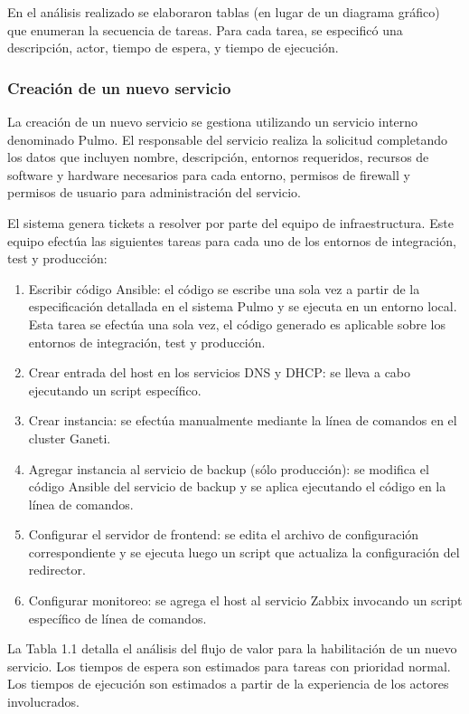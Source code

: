 En el análisis realizado se elaboraron tablas (en lugar de un diagrama gráfico) que enumeran la secuencia de tareas. Para cada tarea, se especificó una descripción, actor, tiempo de espera, y tiempo de ejecución. 

\subsubsection{Creación de un nuevo servicio}

La creación de un nuevo servicio se gestiona utilizando un servicio interno denominado Pulmo. El responsable del servicio realiza la solicitud completando los datos que incluyen nombre, descripción, entornos requeridos, recursos de software y hardware necesarios para cada entorno, permisos de firewall y permisos de usuario para administración del servicio.

El sistema genera tickets a resolver por parte del equipo de infraestructura. Este equipo efectúa las siguientes tareas para cada uno de los entornos de integración, test y producción:

\begin{enumerate}
\item Escribir código Ansible: el código se escribe una sola vez a partir de la especificación detallada en el sistema Pulmo y se ejecuta en un entorno local. Esta tarea se efectúa una sola vez, el código generado es aplicable sobre los entornos de integración, test y producción.
\item Crear entrada del host en los servicios DNS y DHCP: se lleva a cabo ejecutando un script específico.
\item Crear instancia: se efectúa manualmente  mediante la línea de comandos en el cluster Ganeti.
\item Agregar instancia al servicio de backup (sólo producción): se modifica el código Ansible del servicio de backup y se aplica ejecutando el código en la línea de comandos.
\item Configurar el servidor de frontend: se edita el archivo de configuración correspondiente y se ejecuta luego un script que actualiza la configuración del redirector.
\item Configurar monitoreo: se agrega el host al servicio Zabbix invocando un script específico de línea de comandos.
\end{enumerate}
La Tabla 1.1 detalla el análisis del flujo de valor para la habilitación de un nuevo servicio. Los tiempos de espera son estimados para tareas con prioridad normal. Los tiempos de ejecución son estimados a partir de la experiencia de los actores involucrados.

